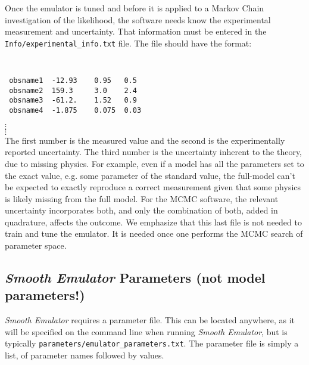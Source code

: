 \documentclass[UserManual.tex]{subfiles}
\begin{document}
\begin{enumerate}
Once the emulator is tuned and before it is applied to a Markov Chain investigation of the likelihood, the software needs know the experimental measurement and uncertainty. That information must be entered in the {\tt Info/experimental\_info.txt} file. The file should have the format:
{\tt
\begin{verbatim}
 obsname1  -12.93    0.95   0.5
 obsname2  159.3     3.0    2.4
 obsname3  -61.2.    1.52   0.9
 obsname4  -1.875    0.075  0.03
\end{verbatim}}
\vspace*{-16pt}
 \hspace*{28pt}$\vdots$\\
 \vspace*{-16pt}
 \hspace*{28pt}$\vdots$\\
The first number is the measured value and the second is the experimentally reported uncertainty. The third number is the uncertainty inherent to the theory, due to missing physics. For example, even if a model has all the parameters set to the exact value, e.g. some parameter of the standard value, the full-model can't be expected to exactly reproduce a correct measurement given that some physics is likely missing from the full model. For the MCMC software, the relevant uncertainty incorporates both, and only the combination of both, added in quadrature, affects the outcome. We emphasize that this last file is not needed to train and tune the emulator. It is needed once one performs the MCMC search of parameter space. 


\end{enumerate}

\subsection{{\it Smooth Emulator} Parameters (not model parameters!)}

{\it Smooth Emulator} requires a parameter file. This can be located anywhere, as it will be specified on the command line when running {\it Smooth Emulator}, but is typically {\tt parameters/emulator\_parameters.txt}. The parameter file is simply a list, of parameter names followed by values. 
\end{document}
